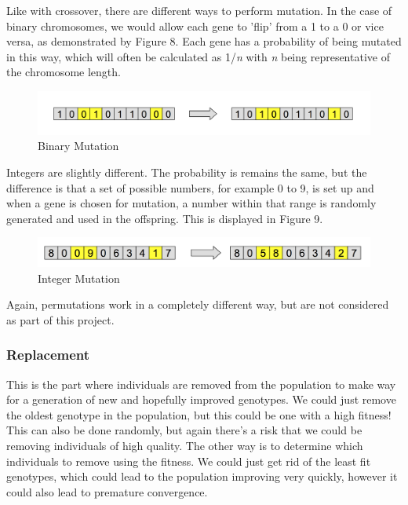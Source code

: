 \documentclass[12pt,a4paper]{article}
\begin{document}
Like with crossover, there are different ways to perform mutation. In the case of binary chromosomes, we would allow each gene to 'flip' from a 1 to a 0 or vice versa, as demonstrated by Figure 8. Each gene has a probability of being mutated in this way, which will often be calculated as 1/\textit{n} with \textit{n} being representative of the chromosome length.


\begin{figure}[h]
	\centering
	\includegraphics[width = \textwidth]{BinaryMutation.png}
	\caption{Binary Mutation}
\end{figure}

Integers are slightly different. The probability is remains the same, but the difference is that a set of possible numbers, for example 0 to 9, is set up and when a gene is chosen for mutation, a number within that range is randomly generated and used in the offspring. This is displayed in Figure 9.\\

\begin{figure}[h]
	\centering
	\includegraphics[width = \textwidth]{IntegerMutation.png}
	\caption{Integer Mutation}
\end{figure}
 
Again, permutations work in a completely different way, but are not considered as part of this project. 

\subsubsection{Replacement}
This is the part where individuals are removed from the population to make way for a generation of new and hopefully improved genotypes. We could just remove the oldest genotype in the population, but this could be one with a high fitness! This can also be done randomly, but again there's a risk that we could be removing individuals of high quality. The other way is to determine which individuals to remove using the fitness. We could just get rid of the least fit genotypes, which could lead to the population improving very quickly, however it could also lead to premature convergence.\\
\end{document}
